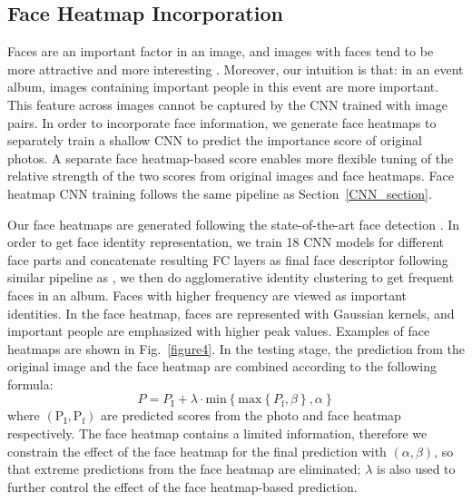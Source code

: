 \documentclass[10pt,twocolumn,letterpaper]{article}
\begin{document}
\subsection{Face Heatmap Incorporation}
Faces are an important factor in an image, and images with faces tend to be more attractive and more interesting \cite{sum_pinaki}. Moreover, our intuition is that: in an event album, images containing important people in this event are more important. This feature across images cannot be captured by the CNN trained with image pairs. In order to incorporate face information, we generate face heatmaps to separately train a shallow CNN to predict the importance score of original photos. A separate face heatmap-based score enables more flexible tuning of the relative strength of the two scores from original images and face heatmaps. Face heatmap CNN training follows the same pipeline as Section~\ref{CNN_section}.

Our face heatmaps are generated following the state-of-the-art face detection \cite{Li_2015_CVPR}. In order to get face identity representation, we train 18 CNN models for different face parts and concatenate resulting FC layers as final face descriptor following similar pipeline as \cite{Sun_2014_CVPR}, we then do agglomerative identity clustering to get frequent faces in an album. Faces with higher frequency are viewed as important identities. In the face heatmap, faces are represented  with Gaussian kernels, and important people are emphasized with higher peak values.
Examples of face heatmaps are shown in Fig.~\ref{figure4}. In the testing stage, the prediction from the original image and the face heatmap are combined according to the following formula:
\begin{equation}
P=P_{\text{I}} + {\lambda} \cdot \text{min}\left \{ \text{max}\left \{ P_{\text{f} }, \beta \right \},\alpha \right \}
\label{equa-face}
\end{equation}
where $(\text{P}_{\text{I}}, \text{P}_{\text{f}})$ are predicted scores from the photo and face heatmap respectively. The face heatmap contains a limited information, therefore we constrain the effect of the face heatmap for the final prediction with $(\alpha, \beta)$, so that extreme predictions from the face heatmap are eliminated; $\lambda$ is also used to further control the effect of the face heatmap-based prediction.
\end{document}
